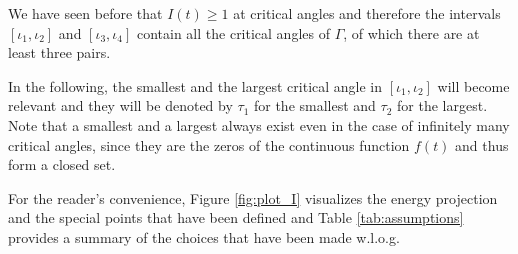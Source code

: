 \documentclass{article}
\begin{document}
We have seen before that $I(t)\ge 1$ at critical angles and therefore the intervals $[\iota_1,\iota_2]$ and $[\iota_3,\iota_4]$ contain all the critical angles of $\Gamma$, of which there are at least three pairs.

In the following, the smallest and the largest critical angle in $[\iota_1,\iota_2]$ will become relevant and they will be denoted by $\tau_1$ for the smallest and $\tau_2$ for the largest.
Note that a smallest and a largest always exist even in the case of infinitely many critical angles, since they are the zeros of the continuous function $f(t)$ and thus form a closed set.
 
For the reader's convenience, Figure \ref{fig:plot_I} visualizes the energy projection and the special points that have been defined and Table \ref{tab:assumptions} provides a summary of the choices that have been made w.l.o.g.
    
\end{document}
